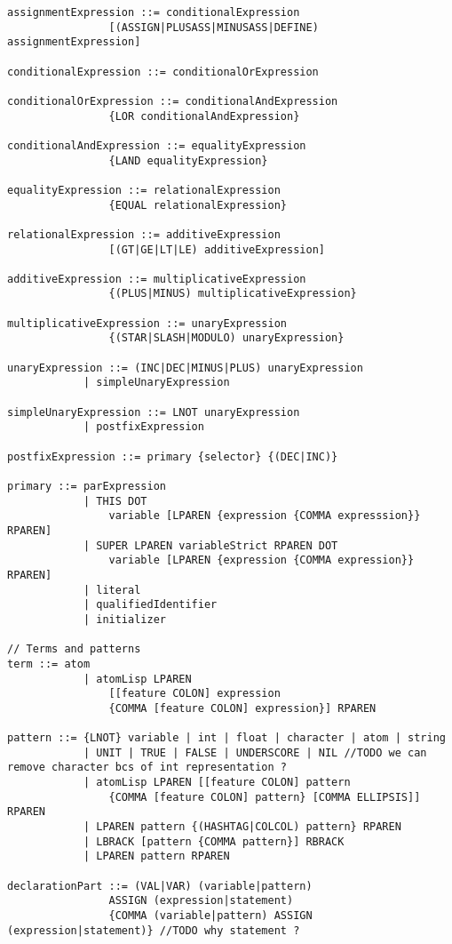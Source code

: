 \begin{lstlisting}[label={lst:newOzEBNF},language=ebnf]
assignmentExpression ::= conditionalExpression
                [(ASSIGN|PLUSASS|MINUSASS|DEFINE) assignmentExpression]

conditionalExpression ::= conditionalOrExpression

conditionalOrExpression ::= conditionalAndExpression
                {LOR conditionalAndExpression}

conditionalAndExpression ::= equalityExpression
                {LAND equalityExpression}

equalityExpression ::= relationalExpression
                {EQUAL relationalExpression}

relationalExpression ::= additiveExpression
                [(GT|GE|LT|LE) additiveExpression]

additiveExpression ::= multiplicativeExpression
                {(PLUS|MINUS) multiplicativeExpression}

multiplicativeExpression ::= unaryExpression
                {(STAR|SLASH|MODULO) unaryExpression}

unaryExpression ::= (INC|DEC|MINUS|PLUS) unaryExpression
            | simpleUnaryExpression

simpleUnaryExpression ::= LNOT unaryExpression
            | postfixExpression

postfixExpression ::= primary {selector} {(DEC|INC)}

primary ::= parExpression
            | THIS DOT
                variable [LPAREN {expression {COMMA expresssion}} RPAREN]
            | SUPER LPAREN variableStrict RPAREN DOT
                variable [LPAREN {expression {COMMA expression}} RPAREN]
            | literal
            | qualifiedIdentifier
            | initializer

// Terms and patterns
term ::= atom
            | atomLisp LPAREN
                [[feature COLON] expression
                {COMMA [feature COLON] expression}] RPAREN

pattern ::= {LNOT} variable | int | float | character | atom | string
            | UNIT | TRUE | FALSE | UNDERSCORE | NIL //TODO we can remove character bcs of int representation ?
            | atomLisp LPAREN [[feature COLON] pattern
                {COMMA [feature COLON] pattern} [COMMA ELLIPSIS]] RPAREN
            | LPAREN pattern {(HASHTAG|COLCOL) pattern} RPAREN
            | LBRACK [pattern {COMMA pattern}] RBRACK
            | LPAREN pattern RPAREN

declarationPart ::= (VAL|VAR) (variable|pattern)
                ASSIGN (expression|statement)
                {COMMA (variable|pattern) ASSIGN (expression|statement)} //TODO why statement ?


\end{lstlisting}
